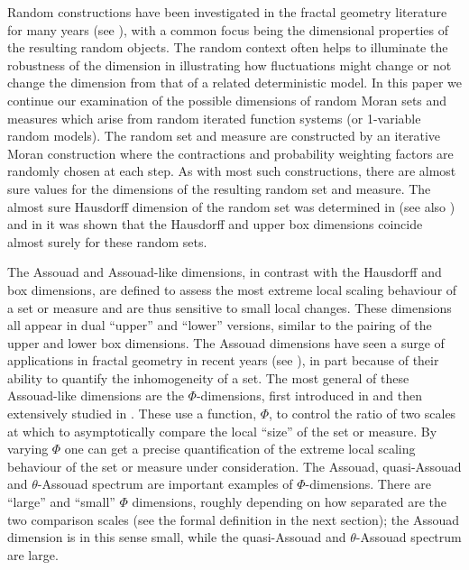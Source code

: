 \documentclass{amsart}
\theoremstyle{plain}
\numberwithin{equation}{section}
\begin{document}
Random constructions have been investigated in the fractal geometry literature for many years
(see \cite{Fa, FMT, FT,  Gr, Ham, HM, Tr0, Tr, Tr2}), with a common focus being the dimensional properties of the resulting random objects.
The random context often helps to illuminate the robustness of the dimension in illustrating how  fluctuations might change or not 
change the dimension from that of a related deterministic model.
In this paper we continue our examination of the possible dimensions of random Moran sets and measures which arise from random iterated function
systems (or 1-variable random models).
The random set and measure are constructed by an iterative Moran construction where the contractions and probability weighting factors are randomly chosen at each step.
As with most such constructions, there are almost sure values for the dimensions of the resulting random set and measure.
The almost sure Hausdorff dimension of the random set was determined in \cite{Ham} (see also \cite{Betc}) and in \cite{Tr0} it was shown that the Hausdorff and upper box dimensions coincide almost surely for these random sets.

The Assouad and Assouad-like dimensions, in contrast with the Hausdorff and box dimensions, are defined to assess the most extreme local scaling behaviour of a set or measure and are thus sensitive to small local changes.
These dimensions all appear in dual ``upper'' and ``lower'' versions, similar to the pairing of the upper and lower box dimensions.
The Assouad dimensions have seen a surge of applications in fractal geometry in recent years (see \cite{BRT23, Fraserbook, FH, FMT, FT, FY, GHM, HH, HM, HM2, HM3, KL, Ol, Tr0, Tr, Tr2}), in part because of their ability to quantify the inhomogeneity of a set.
The most general of these Assouad-like dimensions are the $\Phi$-dimensions, first introduced in \cite{FY} and then extensively studied in \cite{GHM}.
These use a function, $\Phi$, to control the ratio of two scales at which to asymptotically compare the local ``size'' of the set or measure.
By varying $\Phi$ one can get a precise quantification of the extreme local scaling behaviour of the set or measure under consideration.
The Assouad, quasi-Assouad and $\theta$-Assouad spectrum are important examples of $\Phi$-dimensions.
There are ``large'' and ``small'' $\Phi$ dimensions, roughly depending on how separated are the two comparison scales (see the formal definition in the next section); the Assouad dimension is in this sense small, while the quasi-Assouad and $\theta$-Assouad spectrum are large.
\end{document}
